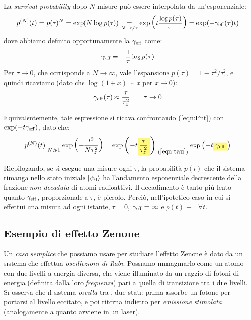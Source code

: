 \documentclass[../../InformazioneQuantistica.tex]{subfiles}
\begin{document}
La \textit{survival probability} dopo $N$ misure può essere interpolata da un'esponenziale:
\begin{align}
p^{(N)}(t) = p(\tau)^N = \exp(N\log p(\tau)) \underset{N=t/\tau}{=} \exp\left(t \frac{\log p(\tau)}{\tau}\right) = \exp(-\gamma_{\operatorname{eff}}(\tau)t)
\label{eqn:Zeno-exp}
\end{align}
dove abbiamo definito opportunamente la  $\gamma_{\operatorname{eff}}$ come:
\begin{align*}
\gamma_{\operatorname{eff}} = -\frac{1}{\tau}\log p(\tau)
\end{align*}
Per $\tau \to 0$, che corrisponde a $N\to \infty$, vale l'espansione $p(\tau)=1-\tau^2/\tau_z^2$, e quindi ricaviamo (dato che $\log(1+x)\sim x$ per $x\to 0$):
\begin{align}
\gamma_{\operatorname{eff}}(\tau) \approx \frac{\tau}{\tau_z^2}\qquad \tau \to 0
\label{eqn:gamma-eff}
\end{align}

\begin{expl}
Equivalentemente, tale espressione si ricava confrontando (\ref{eqn:Pnt}) con $\exp(-t \gamma_{\operatorname{eff}})$, dato che:
\begin{align*}
    p^{(N)}(t) \underset{N\gg1}{=} \exp\left(-\frac{t^2}{N\tau_z^2}\right) = \exp\left(-t \hlc{Yellow}{\frac{\tau}{\tau_z^2}}\right) \underset{(\ref{eqn:tau})}{=} \exp\left(-t \hlc{Yellow}{\gamma_{\op{eff}}}\right)
\end{align*}
\end{expl}

Riepilogando, se si esegue una misure ogni $\tau$, la probabilità $p(t)$ che il sistema rimanga nello stato iniziale $\Ket{\psi_0}$ ha l'andamento esponenziale decrescente della frazione \textit{non decaduta} di atomi radioattivi. Il decadimento è tanto più lento quanto $\gamma_{\operatorname{eff}}$, proporzionale a $\tau$, è piccolo. Perciò, nell'ipotetico caso in cui si effettui una misura ad ogni istante, $\tau=0$, $\gamma_{\operatorname{eff}}=\infty$ e $p(t)\equiv 1 \> \forall t$.

\subsection{Esempio di effetto Zenone}
Un \textit{caso semplice} che possiamo usare per studiare l'effetto Zenone è dato da un sistema che effettua \textit{oscillazioni di Rabi}. Possiamo immaginarlo come un atomo con due livelli a energia diversa, che viene illuminato da un raggio di fotoni di energia (definita dalla loro \textit{frequenza}) pari a quella di transizione tra i due livelli. Si osserva che il sistema \textit{oscilla} tra i due stati: prima assorbe un fotone per portarsi al livello eccitato, e poi ritorna indietro per \textit{emissione stimolata} (analogamente a quanto avviene in un laser).\\
\end{document}
